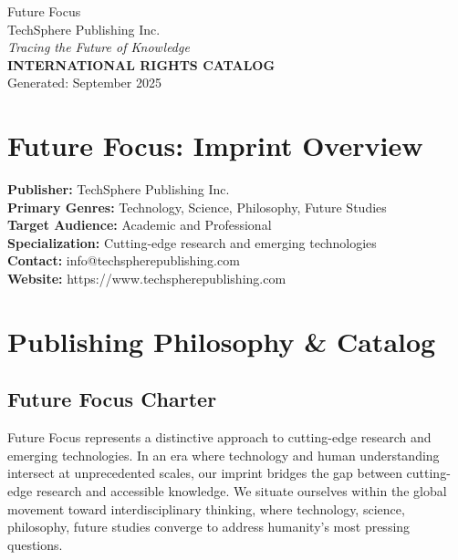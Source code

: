 \documentclass[11pt]{article}
\begin{document}
\thispagestyle{firstpage}

\begin{center}
{\Huge \textcolor{primarycolor}{Future Focus}}\\[0.3cm]
{\Large \textcolor{secondarycolor}{TechSphere Publishing Inc.}}\\[0.2cm]
{\large \textit{Tracing the Future of Knowledge}}\\[0.5cm]
{\large \textbf{INTERNATIONAL RIGHTS CATALOG}}\\[0.3cm]
{\normalsize Generated: September 2025}
\end{center}

\vspace{1cm}

\section{Future Focus: Imprint Overview}

\textbf{Publisher:} TechSphere Publishing Inc.\\
\textbf{Primary Genres:} Technology, Science, Philosophy, Future Studies\\
\textbf{Target Audience:} Academic and Professional\\
\textbf{Specialization:} Cutting-edge research and emerging technologies\\
\textbf{Contact:} info@techspherepublishing.com\\
\textbf{Website:} https://www.techspherepublishing.com\\

\vspace{1cm}

\section{Publishing Philosophy \& Catalog}

\subsection{Future Focus Charter}

Future Focus represents a distinctive approach to cutting-edge research and emerging technologies. In an era where technology and human understanding intersect at unprecedented scales, our imprint bridges the gap between cutting-edge research and accessible knowledge. We situate ourselves within the global movement toward interdisciplinary thinking, where technology, science, philosophy, future studies converge to address humanity's most pressing questions.
\end{document}
